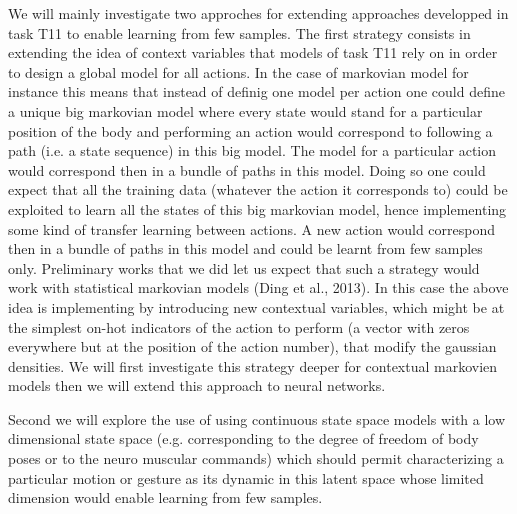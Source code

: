 We will mainly investigate two approches for extending approaches developped in task T11 to enable learning from few samples. The first strategy consists in extending the idea of context variables that models of task T11 rely on in order to design a global model for all actions.
In the case of markovian model for instance this means that instead of definig one model per action one could define a unique big markovian model where every state would stand for a particular position of the body and performing an action would correspond to following a path (i.e. a state sequence) in this big model. 
The model for a particular action would correspond then in a bundle of paths in this model.  Doing so one could expect that all the training data (whatever the action it corresponds to) could be exploited to learn all the states of this big markovian model, hence implementing some kind of transfer learning between actions. 
A new action would correspond then in a bundle of paths in this model and could be learnt from few samples only. Preliminary works that we did let us expect that such a strategy would work with statistical markovian models (Ding et al., 2013). In this case the above idea is implementing by introducing new contextual variables, which might be at the simplest on-hot indicators 
of the action to perform (a vector with zeros everywhere but at the position of the action number), 
that modify the gaussian densities. We will first investigate this strategy deeper for contextual markovien models then we will extend this approach to neural networks. 

Second we will explore the use of using continuous state space models with a low dimensional state space (e.g. corresponding to the degree of freedom of body poses or to the neuro muscular commands) which should permit characterizing a particular motion or gesture as its dynamic in this latent space whose limited dimension would enable learning from few samples.  


